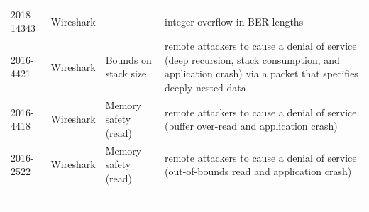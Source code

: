 \documentclass[acmsmall,nonacm]{acmart}
\begin{document}
\begin{longtable}{ l l l p{15em} }
2018-14343   & Wireshark     &  & integer overflow in BER lengths \\ 
2016-4421    & Wireshark     & Bounds on stack size & remote attackers to cause a denial of service (deep recursion, stack consumption, and application crash) via a packet that specifies deeply nested data \\ 
2016-4418    & Wireshark     & Memory safety (read) & remote attackers to cause a denial of service (buffer over-read and application crash) \\ 
2016-2522    & Wireshark     & Memory safety (read) & remote attackers to cause a denial of service (out-of-bounds read and application crash) \\ 
​
\end{longtable}
\newpage
\newpage



\end{document}
